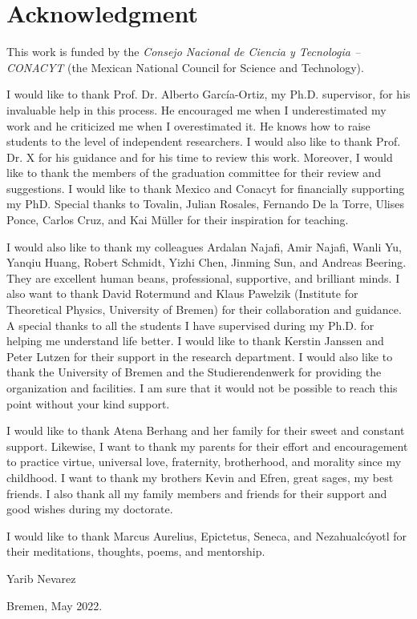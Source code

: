 \chapter*{Acknowledgment}
\thispagestyle{empty}
This work is funded by the \textit{Consejo Nacional de Ciencia y Tecnologia -- CONACYT} (the Mexican National Council for Science and Technology).

I would like to thank Prof. Dr. Alberto Garc\'ia-Ortiz, my Ph.D. supervisor, for his invaluable help in this process. He encouraged me when I underestimated my work and he criticized me when I overestimated it. He knows how to raise students to the level of independent researchers. I would also like to thank Prof. Dr. X for his guidance and for his time to review this work. Moreover, I would like to thank the members of the graduation committee for their review and suggestions. I would like to thank Mexico and Conacyt for financially supporting my PhD. Special thanks to Tovalin, Julian Rosales, Fernando De la Torre, Ulises Ponce, Carlos Cruz, and Kai M\"uller for their inspiration for teaching.

I would also like to thank my colleagues Ardalan Najafi, Amir Najafi, Wanli Yu, Yanqiu Huang, Robert Schmidt, Yizhi Chen, Jinming Sun, and Andreas Beering. They are excellent human beans, professional, supportive, and brilliant minds. I also want to thank David Rotermund and Klaus Pawelzik (Institute for Theoretical Physics, University of Bremen) for their collaboration and guidance. A special thanks to all the students I have supervised during my Ph.D. for helping me understand life better. I would like to thank Kerstin Janssen and Peter Lutzen for their support in the research department. I would also like to thank the University of Bremen and the Studierendenwerk for providing the organization and facilities. I am sure that it would not be possible to reach this point without your kind support.


I would like to thank Atena Berhang and her family for their sweet and constant support. Likewise, I want to thank my parents for their effort and encouragement to practice virtue, universal love, fraternity, brotherhood, and morality since my childhood. I want to thank my brothers Kevin and Efren, great sages, my best friends. I also thank all my family members and friends for their support and good wishes during my doctorate.

I would like to thank Marcus Aurelius, Epictetus, Seneca, and Nezahualc\'oyotl for their meditations, thoughts, poems, and mentorship.


Yarib Nevarez

Bremen, May 2022.





